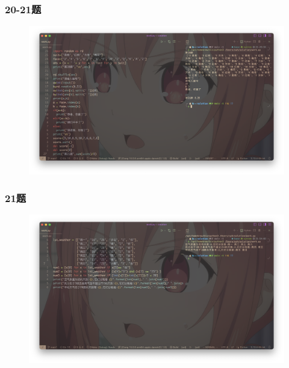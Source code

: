 \documentclass{beamer}
\begin{document}
  \begin{frame}[fragile]
    \frametitle{20-21题}
    \begin{figure}[!htb] %
      \includegraphics[width=1\textwidth,height=0.8\textheight]{./graph/python-trial-6.20-6.21.png} %
    \end{figure}
  \end{frame}
  \begin{frame}[fragile]
    \frametitle{21题}
    \begin{figure}[!htb] %
      \includegraphics[width=1\textwidth,height=0.8\textheight]{./graph/python-trial-6.22.png} %
    \end{figure}
  \end{frame}
\end{document}
